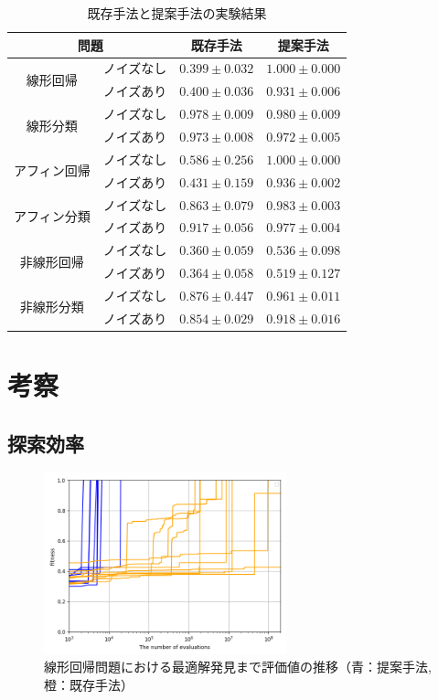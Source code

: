 \documentclass[a4paper,11pt,twocolumn]{jarticle}
\begin{document}
\begin{table}[tbp]
  \caption{既存手法と提案手法の実験結果}
  \label{table:exp:result}
  \centering
  \begin{tabular}{|c|c|c|c|}
    \hline
    \multicolumn{2}{|c|}{問題} & 既存手法 & 提案手法 \\
    \hline
    \multirow{2}{*}{線形回帰}
    & ノイズなし  & $ 0.399 \pm 0.032$ & $\bm{1.000 \pm 0.000}$  \\
    & ノイズあり  & $ 0.400 \pm 0.036$ & $\bm{0.931 \pm 0.006}$  \\
    \multirow{2}{*}{線形分類}
    & ノイズなし  & $ 0.978 \pm 0.009$ & $\bm{0.980 \pm 0.009}$  \\
    & ノイズあり  & $ 0.973 \pm 0.008$ & $\bm{0.972 \pm 0.005}$  \\
    \multirow{2}{*}{アフィン回帰}
    & ノイズなし  & $ 0.586 \pm 0.256$ & $\bm{1.000 \pm 0.000}$  \\
    & ノイズあり  & $ 0.431 \pm 0.159$ & $\bm{0.936 \pm 0.002}$  \\
    \multirow{2}{*}{アフィン分類}
    & ノイズなし  & $ 0.863 \pm 0.079$ & $\bm{0.983 \pm 0.003}$  \\
    & ノイズあり  & $ 0.917 \pm 0.056$ & $\bm{0.977 \pm 0.004}$  \\
    \multirow{2}{*}{非線形回帰}
    & ノイズなし  & $ 0.360 \pm 0.059$ & $\bm{0.536 \pm 0.098}$  \\
    & ノイズあり  & $ 0.364 \pm 0.058$ & $\bm{0.519 \pm 0.127}$  \\
    \multirow{2}{*}{非線形分類}
    & ノイズなし  & $ 0.876 \pm 0.447$ & $\bm{0.961 \pm 0.011}$  \\
    & ノイズあり  & $ 0.854 \pm 0.029$ & $\bm{0.918 \pm 0.016}$  \\
    \hline
  \end{tabular}
\end{table}

\section{考察} \label{sec:discussion}

\subsection{探索効率}
\begin{figure}
  \centering
  \includegraphics[width=7cm]{liner_regression.png}
  \caption{線形回帰問題における最適解発見まで評価値の推移（青：提案手法, 橙：既存手法）}
  \label{fig:discussion:efficiency}
\end{figure}
\end{document}
